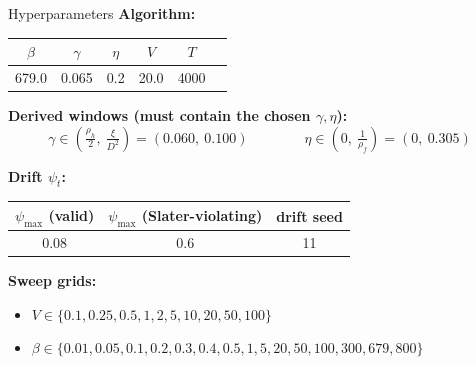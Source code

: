 \documentclass{beamer}
\begin{document}
\begin{frame}{Hyperparameters}
  \small
  \textbf{Algorithm:}
  \begin{center}
  \begin{tabular}{cccccc}
    \toprule
    $\beta$ & $\gamma$ & $\eta$ & $V$ & $T$ \\
    \midrule
    679.0 & 0.065 & 0.2 & 20.0 & 4000 \\
    \bottomrule
  \end{tabular}
  \end{center}

  \vspace{0.5em}
  \textbf{Derived windows (must contain the chosen $\gamma,\eta$):}
  \[
    \gamma \in \left(\tfrac{\rho_h}{2},\ \tfrac{\xi}{D^2}\right) = (0.060,\ 0.100)
    \qquad\qquad
    \eta \in \left(0,\ \tfrac{1}{\rho_f}\right) = (0,\ 0.305)
  \]

  \vspace{0.5em}
  \textbf{Drift $\psi_t$:}
  \begin{center}
  \begin{tabular}{ccc}
    \toprule
    $\psi_{\max}$ (valid) & $\psi_{\max}$ (Slater-violating) & drift seed \\
    \midrule
    0.08 & 0.6 & 11 \\
    \bottomrule
  \end{tabular}
  \end{center}

  \vspace{0.5em}
  \textbf{Sweep grids:}
  \begin{itemize}
    \item $V \in \{0.1, 0.25, 0.5, 1, 2, 5, 10, 20, 50, 100\}$
    \item $\beta \in \{0.01, 0.05, 0.1, 0.2, 0.3, 0.4, 0.5, 1, 5, 20, 50, 100, 300, 679, 800\}$
  \end{itemize}
\end{frame}
\end{document}
